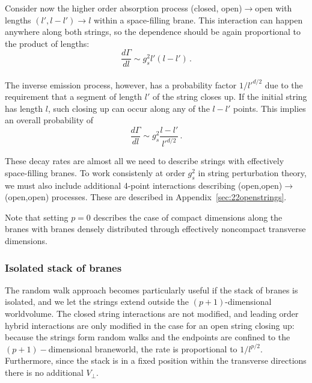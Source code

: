 \documentclass[a4paper,11pt]{article}
\begin{document}
Consider now the higher order absorption process (closed, open)$\rightarrow$open with lengths $(l',l-l')\rightarrow l$ within a space-filling brane.
This interaction can happen anywhere along both strings, so the dependence should be again proportional to the product of lengths:
\begin{equation}
    \frac{d\Gamma}{dl}\sim g_s^2 l' (l-l') \, .
\end{equation}
\\

The inverse emission process, however, has a probability factor $1/l'^{d/2}$ due to the requirement that a segment of length $l'$ of the string closes up.
If the initial string has length $l$, such closing up can occur along any of the $l-l'$ points.
This implies an overall probability of
\begin{equation}
    \frac{d\Gamma}{dl}\sim g_s^2\frac{l-l'}{l'^{d/2}} \, .
\end{equation}

These decay rates are almost all we need to describe strings with effectively space-filling branes. To work consistenly at order $g_s^2$
in string perturbation theory, we must also include additional 4-point interactions describing (open,open)$\rightarrow$(open,open) processes.
These are described in Appendix~\ref{sec:22openstrings}.

Note that setting $p=0$ describes the case of compact dimensions along the
branes with branes densely distributed through effectively noncompact transverse
dimensions.

\subsubsection*{Isolated stack of branes}

The random walk approach becomes particularly useful if the stack of branes is isolated, and we let the strings extend outside the $(p+1)$-dimensional worldvolume.
The closed string interactions are not modified, and leading order hybrid interactions are only modified in the case for an open string closing up: because the strings form random walks and the endpoints are confined to the $(p+1)-$dimensional braneworld, the rate is proportional to $1/l^{p/2}$.
Furthermore, since the stack is in a fixed position within the transverse directions there is no additional $V_{\perp}$.
\\
\end{document}
